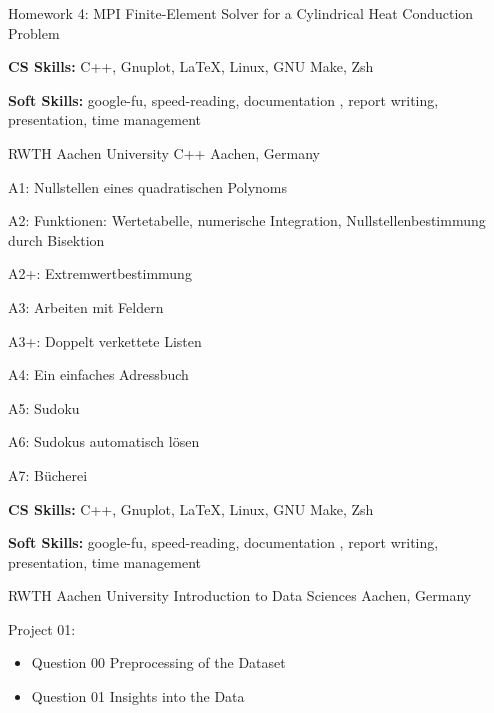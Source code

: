 \begin{cventries}
{\begin{cvitems}
        \item {Homework 4: MPI Finite-Element Solver for a Cylindrical Heat Conduction Problem}
        \item {\textbf{CS Skills:} C++, Gnuplot, LaTeX, Linux, GNU Make, Zsh}
        \item {\textbf{Soft Skills:} google-fu, speed-reading, documentation , report writing, presentation, time management}
      \end{cvitems}
    }
  \cventry
    {RWTH Aachen University} %
    {C++} %
    {Aachen, Germany} %
    {} %
    {
      \begin{cvitems} %
        \item {A1: Nullstellen eines quadratischen Polynoms}
        \item {A2: Funktionen: Wertetabelle, numerische Integration, Nullstellenbestimmung durch Bisektion}
        \item {A2+: Extremwertbestimmung}
        \item {A3: Arbeiten mit Feldern}
        \item {A3+: Doppelt verkettete Listen}
        \item {A4: Ein einfaches Adressbuch}
        \item {A5: Sudoku}
        \item {A6: Sudokus automatisch lösen}
        \item {A7: Bücherei} 
        \item {\textbf{CS Skills:} C++, Gnuplot, LaTeX, Linux, GNU Make, Zsh}
        \item {\textbf{Soft Skills:} google-fu, speed-reading, documentation , report writing, presentation, time management}
      \end{cvitems}
    }
  \cventry
    {RWTH Aachen University} %
    {Introduction to Data Sciences} %
    {Aachen, Germany} %
    {} %
    {
      \begin{cvitems} %
        \item {Project 01:
        \begin{itemize}
        \item Question 00 Preprocessing of the Dataset 
        \item Question 01 Insights into the Data
        \begin{itemize}

\end{itemize}
\end{itemize}}
\end{cvitems}}
\end{cventries}
